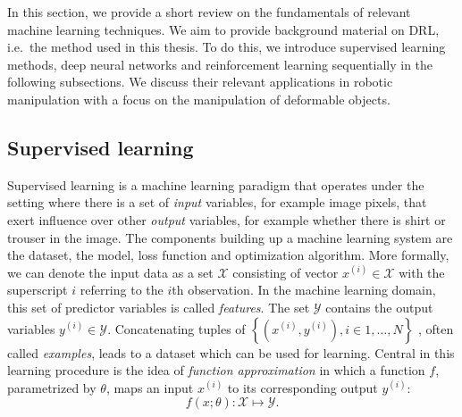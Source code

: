 \documentclass[\home/main.tex]{subfiles}
\begin{document}
In this section, we provide a short review on the fundamentals of relevant machine learning techniques. We aim to provide background material on \gls{DRL}, i.e.\ the method used in this thesis. To do this, we introduce supervised learning methods, deep neural networks and reinforcement learning sequentially in the following subsections. We discuss their relevant applications in robotic manipulation with a focus on the manipulation of deformable objects. %

\subsection{Supervised learning} \label{subsec:lit_sl}

Supervised learning is a machine learning paradigm that operates under the setting where there is a set of \textit{input} variables, for example image pixels, that exert influence over other \textit{output} variables, for example whether there is shirt or trouser in the image.
The components building up a machine learning system are the dataset, the model, loss function and optimization algorithm.
More formally, we can denote the input data as a set $\mathcal{X}$ consisting of vector $x^{(i)} \in \mathcal{X} $ with the superscript $i$ referring to the $i$th observation. In the machine learning domain, this set of predictor variables is called \textit{features}. The set $\mathcal{Y}$ contains the output variables $y^{(i)} \in \mathcal{Y}$. Concatenating tuples of
$\left\{\left(x^{(i)}, y^{(i)}\right) , i \in 1,\dots,N \right\}$
, often called \textit{examples}, leads to a dataset which can be used for learning. Central in this learning procedure is the idea of \textit{function approximation} in which a function $f$, parametrized by $\theta$, maps an input $x^{(i)}$ to its corresponding output $y^{(i)}$:
\begin{equation*}
	f(x;\theta): \mathcal{X} \mapsto \mathcal{Y}\text{.}
\end{equation*}
\end{document}
